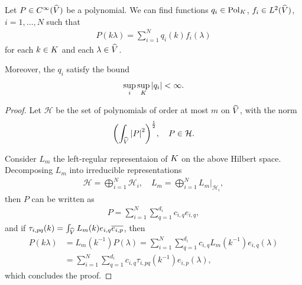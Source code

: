 \begin{lemma}
\label{lemma:left_regular_representation_of_polynomials}
    Let $P \in {C^\infty({\widehat{V}})}$ be a polynomial.
    We can find functions $q_i \in {\mathrm{Pol}_{K}}$, $f_i \in {L^{2} ({\widehat{V}})}$, $i = 1, \dots, N$ such that
    \begin{align*}
        P(k \lambda) = \sum_{i = 1}^N q_i(k) f_i(\lambda)
    \end{align*}
    for each $k \in K$ and each $\lambda \in {\widehat{V}}$.

    Moreover, the $q_i$ satisfy the bound
    \begin{align*}
        \sup_i \sup_K \left|{q_i}\right| < \infty.
    \end{align*}
\end{lemma}
\begin{proof}
    Let $\mathcal{H}$ be the set of polynomials of order at most $m$ on ${\widehat{V}}$,
    with the norm
    \begin{align}
        {\left( \int_{\widehat{V}} \left|{P}\right|^2 \right)}^\frac{1}{2}, \quad P \in \mathcal{H}.
    \end{align}

    Consider $L_m$ the left-regular representaion of $K$ on the above Hilbert space.
    Decomposing $L_m$ into irreducible representations
    \begin{align}
        \mathcal{H} = \bigoplus_{i = 1}^N \mathcal{H}_i,
        \quad L_m = \bigoplus_{i = 1}^N \left. L_m \right|_{\mathcal{H}_i},
    \end{align}
    then $P$ can be written as
    \begin{align*}
        P = \sum_{i = 1}^N \sum_{q = 1}^{d_i} c_{i, q} e_{i, q},
    \end{align*}
    and if $\tau_{i, pq}(k) = \int_{\widehat{V}} L_m(k) e_{i, q} \overline{e_{i, p}}$, then
    \begin{align*}
        P(k \lambda) &= L_m(k^{-1}) P(\lambda)
        = \sum_{i = 1}^N \sum_{q = 1}^{d_i} c_{i, q} L_m(k^{-1}) e_{i, q}(\lambda)\\
        &= \sum_{i = 1}^N \sum_{q = 1}^{d_i} c_{i, q} \tau_{i, pq}(k^{-1}) e_{i, p}(\lambda),
    \end{align*}
    which concludes the proof.
\end{proof}

